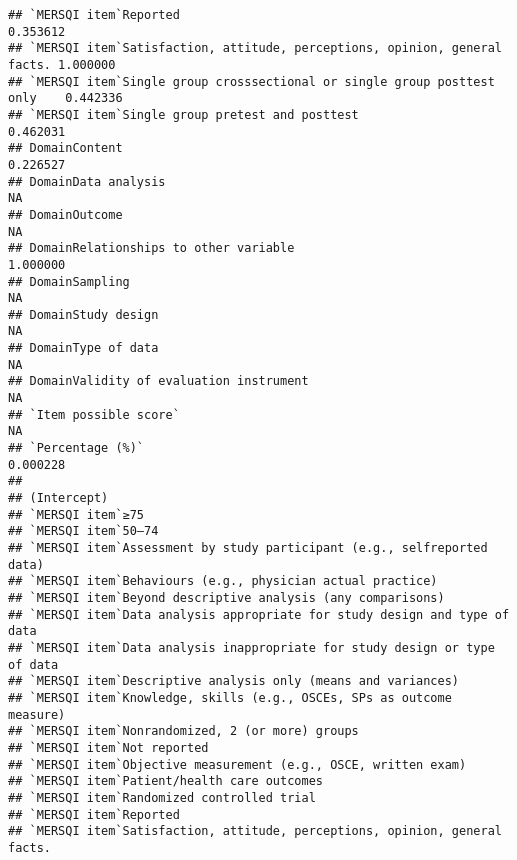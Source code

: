 \documentclass[]{article}
\begin{document}
\begin{verbatim}
## `MERSQI item`Reported                                                     0.353612
## `MERSQI item`Satisfaction, attitude, perceptions, opinion, general facts. 1.000000
## `MERSQI item`Single group crosssectional or single group posttest only    0.442336
## `MERSQI item`Single group pretest and posttest                            0.462031
## DomainContent                                                             0.226527
## DomainData analysis                                                             NA
## DomainOutcome                                                                   NA
## DomainRelationships to other variable                                     1.000000
## DomainSampling                                                                  NA
## DomainStudy design                                                              NA
## DomainType of data                                                              NA
## DomainValidity of evaluation instrument                                         NA
## `Item possible score`                                                           NA
## `Percentage (%)`                                                          0.000228
##                                                                              
## (Intercept)                                                                  
## `MERSQI item`≥75                                                             
## `MERSQI item`50–74                                                           
## `MERSQI item`Assessment by study participant (e.g., selfreported data)       
## `MERSQI item`Behaviours (e.g., physician actual practice)                    
## `MERSQI item`Beyond descriptive analysis (any comparisons)                   
## `MERSQI item`Data analysis appropriate for study design and type of data     
## `MERSQI item`Data analysis inappropriate for study design or type of data    
## `MERSQI item`Descriptive analysis only (means and variances)                 
## `MERSQI item`Knowledge, skills (e.g., OSCEs, SPs as outcome measure)         
## `MERSQI item`Nonrandomized, 2 (or more) groups                               
## `MERSQI item`Not reported                                                    
## `MERSQI item`Objective measurement (e.g., OSCE, written exam)                
## `MERSQI item`Patient/health care outcomes                                    
## `MERSQI item`Randomized controlled trial                                     
## `MERSQI item`Reported                                                        
## `MERSQI item`Satisfaction, attitude, perceptions, opinion, general facts.    

\end{verbatim}
\end{document}
